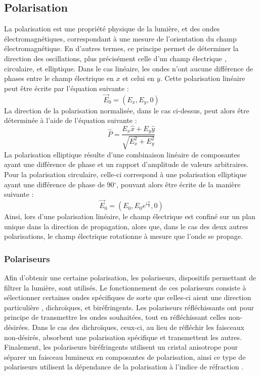 \documentclass[11pt,letterpaper]{article}
\begin{document}
\subsection{Polarisation}
La polarisation est une propriété physique de la lumière, et des ondes électromagnétiques, correspondant à une mesure de l'orientation du champ électromagnétique. En d'autres termes, ce principe permet de déterminer la direction des oscillations, plus précisément celle d'un champ électrique \cite{national_aeronautics_and_space_administration_anatomy_2010}, circulaire, et elliptique. Dans le cas linéaire, les ondes n'ont aucune différence de phases entre le champ électrique en $x$ et celui en $y$. Cette polarisation linéaire peut être écrite par l'équation suivante \cite{schwartz_lecture_2021} :
\begin{equation}
  \vec{E}_{0}=(E_{x},E_{y},0)
  \label{pol_lin}
\end{equation}
La direction de la polarisation normalisée, dans le cas ci-dessus, peut alors être déterminée à l'aide de l'équation suivante :
\begin{equation}
  \hat{P}=\frac{E_{x}\hat{x}+E_{y}\hat{y}}{\sqrt{E_{x}^{2}+E_{y}^{2}}}
\end{equation}
La polarisation elliptique résulte d'une combinaison linéaire de composantes ayant une différence de phase et un rapport d'amplitude de valeurs arbitraires. Pour la polarisation circulaire, celle-ci correspond à une polarisation elliptique ayant une différence de phase de 90$^\circ$, pouvant alors être écrite de la manière suivante \cite{erdogan_understanding_2024}:
\begin{equation}
  \vec{E}_{0}=(E_{0},E_{0}e^{i\frac{\pi}{2}},0)
\end{equation}
Ainsi, lors d'une polarisation linéaire, le champ électrique est confiné sur un plan unique dans la direction de propagation, alors que, dans le cas des deux autres polarisations, le champ électrique rotationne à mesure que l'onde se propage.

\subsubsection{Polariseurs}
Afin d'obtenir une certaine polarisation, les polariseurs, dispositifs permettant de filtrer la lumière, sont utilisés. Le fonctionnement de ces polariseurs consiste à sélectionner certaines ondes spécifiques de sorte que celles-ci aient une direction particulière \cite{zangwill_modern_2012}, dichroïques, et biréfringents. Les polariseurs réfléchissants ont pour principe de transmettre les ondes souhaitées, tout en réfléchissant celles non-désirées. Dans le cas des dichroïques, ceux-ci, au lieu de réfléchir les faisceaux non-désirés, absorbent une polarisation spécifique et transmettent les autres. Finalement, les polariseurs biréfringents utilisent un cristal anisotrope pour séparer un faisceau lumineux en composantes de polarisation, ainsi ce type de polariseurs utilisent la dépendance de la polarisation à l'indice de réfraction \cite{noauthor_introduction_2023}.
\end{document}
